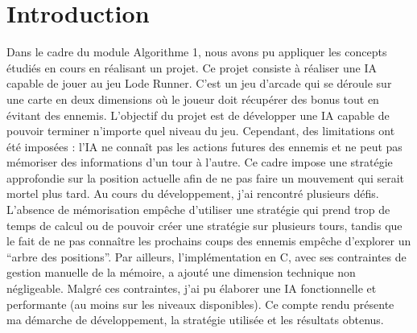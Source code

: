 \chapter{Introduction}
\label{cp:introduction}
Dans le cadre du module Algorithme 1, nous avons pu appliquer les concepts étudiés en cours en réalisant un projet. Ce projet consiste à réaliser une IA capable de jouer au jeu Lode Runner. C'est un jeu d'arcade qui se déroule sur une carte en deux dimensions où le joueur doit récupérer des bonus tout en évitant des ennemis. 
\newline\newline
L'objectif du projet est de développer une IA capable de pouvoir terminer n'importe quel niveau du jeu. Cependant, des limitations ont été imposées : l'IA ne connaît pas les actions futures des ennemis et ne peut pas mémoriser des informations d'un tour à l'autre. Ce cadre impose une stratégie approfondie sur la position actuelle afin de ne pas faire un mouvement qui serait mortel plus tard.
\newline\newline
Au cours du développement, j'ai rencontré plusieurs défis. L'absence de mémorisation empêche d'utiliser une stratégie qui prend trop de temps de calcul ou de pouvoir créer une stratégie sur plusieurs tours, tandis que le fait de ne pas connaître les prochains coups des ennemis empêche d'explorer un “arbre des positions”. Par ailleurs, l'implémentation en C, avec ses contraintes de gestion manuelle de la mémoire, a ajouté une dimension technique non négligeable.
\newline\newline
Malgré ces contraintes, j'ai pu élaborer une IA fonctionnelle et performante (au moins sur les niveaux disponibles).
\newline\newline
Ce compte rendu présente ma démarche de développement, la stratégie utilisée et les résultats obtenus.